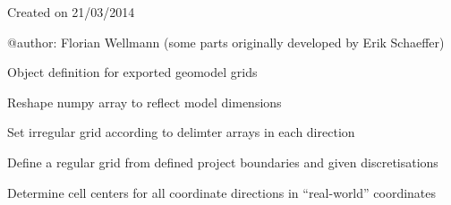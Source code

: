 \documentclass[letterpaper,10pt,english]{sphinxmanual}
\begin{document}
Created on 21/03/2014

@author: Florian Wellmann (some parts originally developed by Erik Schaeffer)

\begin{fulllineitems}
\label{pygeomod:pygeomod.geogrid.GeoGrid}
Object definition for exported geomodel grids

\begin{fulllineitems}
\label{pygeomod:pygeomod.geogrid.GeoGrid.adjust_gridshape}
Reshape numpy array to reflect model dimensions

\end{fulllineitems}


\begin{fulllineitems}
\label{pygeomod:pygeomod.geogrid.GeoGrid.define_irregular_grid}
Set irregular grid according to delimter arrays in each direction

\end{fulllineitems}


\begin{fulllineitems}
\label{pygeomod:pygeomod.geogrid.GeoGrid.define_regular_grid}
Define a regular grid from defined project boundaries and given discretisations

\end{fulllineitems}


\begin{fulllineitems}
\label{pygeomod:pygeomod.geogrid.GeoGrid.determine_cell_centers}
Determine cell centers for all coordinate directions in ``real-world'' coordinates

\end{fulllineitems}


\end{fulllineitems}
\end{document}
